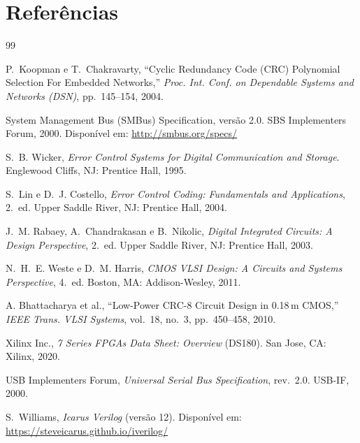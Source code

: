 \documentclass[12pt,a4paper]{article}
\begin{document}
\section*{Referências}

\begin{thebibliography}{99}

  P.~Koopman e T.~Chakravarty,
  ``Cyclic Redundancy Code (CRC) Polynomial Selection For Embedded Networks,''
  \textit{Proc. Int. Conf. on Dependable Systems and Networks (DSN)},
  pp.~145--154, 2004.

  System Management Bus (SMBus) Specification, versão 2.0.
  SBS Implementers Forum, 2000.
  Disponível em: \url{http://smbus.org/specs/}

  S.~B. Wicker,
  \textit{Error Control Systems for Digital Communication and Storage}.
  Englewood Cliffs, NJ: Prentice Hall, 1995.

  S.~Lin e D.~J. Costello,
  \textit{Error Control Coding: Fundamentals and Applications}, 2.~ed.
  Upper Saddle River, NJ: Prentice Hall, 2004.

  J.~M. Rabaey, A.~Chandrakasan e B.~Nikolic,
  \textit{Digital Integrated Circuits: A Design Perspective}, 2.~ed.
  Upper Saddle River, NJ: Prentice Hall, 2003.

  N.~H.~E. Weste e D.~M. Harris,
  \textit{CMOS VLSI Design: A Circuits and Systems Perspective}, 4.~ed.
  Boston, MA: Addison-Wesley, 2011.

  A. Bhattacharya et al.,
  ``Low-Power CRC-8 Circuit Design in 0.18\,\textmu m CMOS,''
  \textit{IEEE Trans. VLSI Systems}, vol.~18, no.~3, pp.~450--458, 2010.

  Xilinx Inc.,
  \textit{7 Series FPGAs Data Sheet: Overview} (DS180).
  San Jose, CA: Xilinx, 2020.

  USB Implementers Forum,
  \textit{Universal Serial Bus Specification}, rev.\ 2.0.
  USB-IF, 2000.

  S.~Williams,
  \textit{Icarus Verilog} (versão 12).
  Disponível em: \url{https://steveicarus.github.io/iverilog/}

\end{thebibliography}
\end{document}
